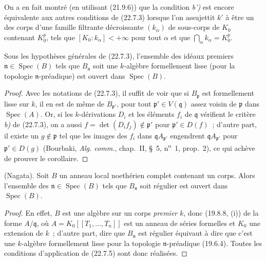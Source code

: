 
\begin{remark}[22.7.4]
\label{0.22.7.4-fr}
On a en fait montré (en utilisant (21.9.6)) que la condition \emph{b')} est encore
équivalente aux autres conditions de (22.7.3) lorsque l'on assujettit $k'$ à
être un des corps d'une famille filtrante décroissante $(k_\alpha)$ de
sous-corps de $K_0$ contenant $K_0^p$, tels que
$[K_0:k_\alpha]<+\infty$ pour tout $\alpha$ et que
$\bigcap_\alpha k_\alpha=K_0^p$.
\end{remark}

\begin{corollary}[22.7.5]
\label{0.22.7.5-fr}
Sous les hypothèses générales de \textup{(22.7.3)}, l'ensemble des idéaux premiers
$\mathfrak n\in\operatorname{Spec}(B)$ tels que $B_{\mathfrak n}$ soit une
$k$-algèbre formellement lisse (pour la topologie $\mathfrak n$-préadique)
est ouvert dans $\operatorname{Spec}(B)$.
\end{corollary}

\begin{proof}
Avec les notations de (22.7.3), il suffit de voir que si $B_{\mathfrak p}$
est formellement lisse sur $k$, il en est de même de $B_{\mathfrak p'}$, pour
tout $\mathfrak p'\in V(\mathfrak q)$ assez voisin de $\mathfrak p$ dans
$\operatorname{Spec}(A)$. Or, si les $k$-dérivations $D_i$ et les éléments
$f_i$ de $\mathfrak q$ vérifient le critère \emph{b)} de (22.7.3), on a aussi
$f=\det(D_if_j)\notin\mathfrak p'$ pour $\mathfrak p'\in D(f)$~; d'autre
part, il existe un $g\notin\mathfrak p$ tel que les images des $f_i$ dans
$\mathfrak qA_{\mathfrak p'}$ engendrent $\mathfrak qA_{\mathfrak p'}$ pour
$\mathfrak p'\in D(g)$ (Bourbaki, \emph{Alg. comm.}, chap.~II, §~5,
n\textsuperscript{o}~1, prop.~2), ce qui achève de prouver le corollaire.
\end{proof}

\begin{corollary}[22.7.6]
\label{0.22.7.6-fr}
\textnormal{(Nagata).} Soit $B$ un anneau local noethérien complet contenant
un corps. Alors l'ensemble des $\mathfrak n\in\operatorname{Spec}(B)$ tels
que $B_{\mathfrak n}$ soit régulier est ouvert dans $\operatorname{Spec}(B)$.
\end{corollary}

\begin{proof}
En effet, $B$ est une algèbre sur un corps \emph{premier} $k$, donc (19.8.8, (i))
de la forme $A/\mathfrak q$, où
$A=K_0[[T_1,\ldots,T_n]]$ est un anneau de séries formelles et $K_0$ une
extension de $k$~; d'autre part, dire que $B_{\mathfrak n}$ est régulier
équivaut à dire que c'est une $k$-algèbre formellement lisse pour la topologie
$\mathfrak n$-préadique (19.6.4). Toutes les conditions d'application de
(22.7.5) sont donc réalisées.
\end{proof}

